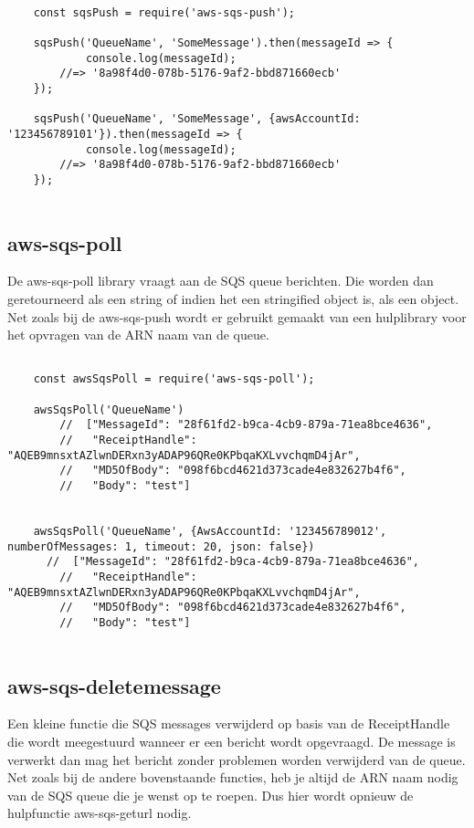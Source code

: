 \begin{lstlisting}[caption=Voorbeeld dat data plaatst op een SQS queue met behulp van de aws-sqs-push library]

	const sqsPush = require('aws-sqs-push');

	sqsPush('QueueName', 'SomeMessage').then(messageId => {
    		console.log(messageId);
    	//=> '8a98f4d0-078b-5176-9af2-bbd871660ecb'
	});

	sqsPush('QueueName', 'SomeMessage', {awsAccountId: '123456789101'}).then(messageId => {
    		console.log(messageId);
    	//=> '8a98f4d0-078b-5176-9af2-bbd871660ecb'
	});
	
\end{lstlisting}
\clearpage
\subsection{aws-sqs-poll}
De aws-sqs-poll library vraagt aan de SQS queue berichten. Die worden dan geretourneerd als een string of indien het een stringified object is, als een object. Net zoals bij de aws-sqs-push wordt er gebruikt gemaakt van een hulplibrary voor het opvragen van de ARN naam van de queue.

\begin{lstlisting}[caption=Voorbeeld hoe berichten worden opgehaald van de SQS queue]

	const awsSqsPoll = require('aws-sqs-poll');

	awsSqsPoll('QueueName')
    	//  ["MessageId": "28f61fd2-b9ca-4cb9-879a-71ea8bce4636",
    	//   "ReceiptHandle": "AQEB9mnsxtAZlwnDERxn3yADAP96QRe0KPbqaKXLvvchqmD4jAr",
    	//   "MD5OfBody": "098f6bcd4621d373cade4e832627b4f6",
    	//   "Body": "test"]


	awsSqsPoll('QueueName', {AwsAccountId: '123456789012', numberOfMessages: 1, timeout: 20, json: false})
  	  //  ["MessageId": "28f61fd2-b9ca-4cb9-879a-71ea8bce4636",
    	//   "ReceiptHandle": "AQEB9mnsxtAZlwnDERxn3yADAP96QRe0KPbqaKXLvvchqmD4jAr",
    	//   "MD5OfBody": "098f6bcd4621d373cade4e832627b4f6",
    	//   "Body": "test"]
	
\end{lstlisting}

\subsection{aws-sqs-deletemessage}
Een kleine functie die SQS messages verwijderd op basis van de ReceiptHandle die wordt meegestuurd wanneer er een bericht wordt opgevraagd. De message is verwerkt dan mag het bericht zonder problemen worden verwijderd van de queue. Net zoals bij de andere bovenstaande functies, heb je altijd de ARN naam nodig van de SQS queue die je wenst op te roepen. Dus hier wordt opnieuw de hulpfunctie aws-sqs-geturl nodig.

